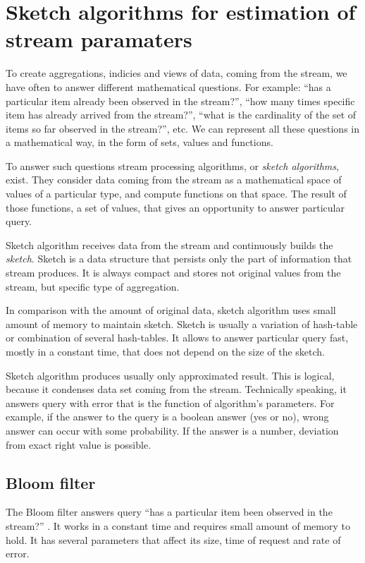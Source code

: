 \section{Sketch algorithms for estimation of stream paramaters}

To create aggregations, indicies and views of data, coming from the stream, we have often to answer different mathematical questions.
For example: ``has a particular item already been observed in the stream?'', ``how many times specific item has already arrived from the stream?'', ``what is the cardinality of the set of items so far observed in the stream?'', etc.
We can represent all these questions in a mathematical way, in the form of sets, values and functions.

To answer such questions stream processing algorithms, or \textit{sketch algorithms}, exist.
They consider data coming from the stream as a mathematical space of values of a particular type, and compute functions on that space.
The result of those functions, a set of values, that gives an opportunity to answer particular query.

Sketch algorithm receives data from the stream and continuously builds the \textit{sketch}.
Sketch is a data structure that persists only the part of information that stream produces.
It is always compact and stores not original values from the stream, but specific type of aggregation.

In comparison with the amount of original data, sketch algorithm uses small amount of memory to maintain sketch.
Sketch is usually a variation of hash-table or combination of several hash-tables.
It allows to answer particular query fast, mostly in a constant time, that does not depend on the size of the sketch.

Sketch algorithm produces usually only approximated result.
This is logical, because it condenses data set coming from the stream.
Technically speaking, it answers query with error that is the function of algorithm's parameters.
For example, if the answer to the query is a boolean answer (yes or no), wrong answer can occur with some probability.
If the answer is a number, deviation from exact right value is possible.

\subsection{Bloom filter}

The Bloom filter answers query ``has a particular item been observed in the stream?'' \cite{Cormode}.
It works in a constant time and requires small amount of memory to hold.
It has several parameters that affect its size, time of request and rate of error.

